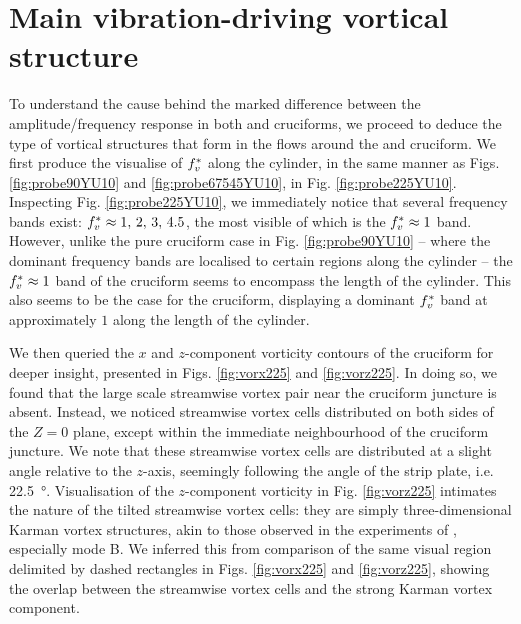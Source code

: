 \documentclass[oneside]{utmthesis}
\begin{document}
\section{Main vibration-driving vortical structure}\label{sec:kvivRegimeVortStruct}
To understand the cause behind the marked difference between the amplitude/frequency response in both \angfo{} and \angth{} cruciforms, we proceed to deduce the type of vortical structures that form in the flows around the \angtw{} and \angon{} cruciform. We first produce the visualise of $f^{*}_{v}$ along the cylinder, in the same manner as Figs. \ref{fig:probe90YU10} and \ref{fig:probe67545YU10}, in Fig. \ref{fig:probe225YU10}. Inspecting Fig. \ref{fig:probe225YU10}, we immediately notice that several frequency bands exist: $f^{*}_{v} \approx 1,\, 2,\, 3,\, 4.5$, the most visible of which is the $f^{*}_{v} \approx 1$ band. However, unlike the pure cruciform case in Fig. \ref{fig:probe90YU10} -- where the dominant frequency bands are localised to certain regions along the cylinder -- the $f^{*}_{v} \approx 1$ band of the \angtw{} cruciform seems to encompass the length of the cylinder. This also seems to be the case for the \angon{} cruciform, displaying a dominant $f^{*}_{v}$ band at approximately $1$ along the length of the cylinder.

We then queried the $x$ and $z$-component vorticity contours of the \angtw{} cruciform for deeper insight, presented in Figs. \ref{fig:vorx225} and \ref{fig:vorz225}. In doing so, we found that the large scale streamwise vortex pair near the cruciform juncture is absent. Instead, we noticed streamwise vortex cells distributed on both sides of the $Z = 0$ plane, except within the immediate neighbourhood of the cruciform juncture. We note that these streamwise vortex cells are distributed at a slight angle relative to the $z$-axis, seemingly following the angle of the strip plate, i.e. \SI{22.5}{\degree}. Visualisation of the $z$-component vorticity in Fig. \ref{fig:vorz225} intimates the nature of the tilted streamwise vortex cells: they are simply three-dimensional Karman vortex structures, akin to those observed in the experiments of \citet{Williamson1996}, especially mode B. We inferred this from comparison of the same visual region delimited by dashed rectangles in Figs. \ref{fig:vorx225} and \ref{fig:vorz225}, showing the overlap between the streamwise vortex cells and the strong Karman vortex component.
\end{document}
